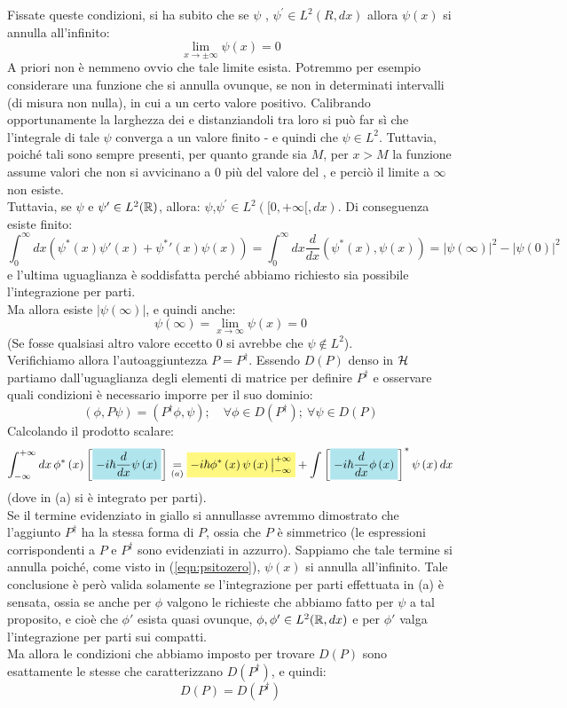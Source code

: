 \documentclass[../../FisicaTeorica.tex]{subfiles}
\begin{document}
Fissate queste condizioni, si ha subito che se $\psi$ , $\psi^\prime\in L^2(R, dx)$ allora $\psi(x)$ si annulla all'infinito:
\[
\lim_{x\rightarrow\pm\infty}{\psi\left(x\right)}=0
\]
A priori non è nemmeno ovvio che tale limite esista. Potremmo per esempio considerare una funzione che si annulla ovunque, se non in determinati intervalli (di misura non nulla), in cui  a un certo valore positivo. Calibrando opportunamente la larghezza dei  e distanziandoli tra loro si può far sì che l'integrale di tale $\psi$ converga a un valore finito - e quindi che $\psi \in L^2$. Tuttavia, poiché tali  sono sempre presenti, per quanto grande sia $M$, per $x>M$ la funzione assume valori che non si avvicinano a $0$ più del valore del , e perciò il limite a $\infty$ non esiste.\\
Tuttavia, se $\psi$ e $\psi' \in L^2(\mathbb{R})$, allora: $\psi$,$\psi^\prime\in L^2([0, +\infty [, dx)$. Di conseguenza esiste finito:
\[
\int_0^\infty dx (\psi^*(x)\psi'(x)+{\psi^*}'(x)\psi(x)) = \int_0^\infty dx \frac{d}{dx}(\psi^*(x), \psi(x)) = |\psi(\infty)|^2 - |\psi(0)|^2
\]
e l'ultima uguaglianza è soddisfatta perché abbiamo richiesto sia possibile l'integrazione per parti.\\
Ma allora esiste $|\psi(\infty)|$, e quindi anche:
\begin{equation}
\psi(\infty) = \lim_{x\to\infty} \psi(x) = 0
\label{eqn:psitozero}
\end{equation}
(Se fosse qualsiasi altro valore eccetto $0$ si avrebbe che $\psi \notin L^2$).\\

Verifichiamo allora l'autoaggiuntezza $P = P^\dag$. Essendo $D(P)$ denso in $\mathcal{H}$ partiamo dall'uguaglianza degli elementi di matrice per definire $P^\dag$ e osservare quali condizioni è necessario imporre per il suo dominio:
\[
\left(\phi,P\psi\right)=(P^\dag\phi,\psi); \quad \forall \phi \in D(P^\dag);\> \forall \psi \in D(P)
\]
Calcolando il prodotto scalare:
\[
\int_{-\infty}^{+\infty}{dx\,\phi^\ast\left(x\right)\left[\hlc{SkyBlue}{-i\hbar\frac{d}{dx}\psi\left(x\right)}\right]\underset{(a)}{=}
\hlc{Yellow}{-i\hbar\phi^\ast\left(x\right)\psi\left(x\right)\big|_{-\infty}^{+\infty}}+\int{\left[\hlc{SkyBlue}{-i\hbar\frac{d}{dx}\phi\left(x\right)}\right]^\ast\psi\left(x\right)dx}}
\]
(dove in (a) si è integrato per parti).\\
Se il termine evidenziato in giallo si annullasse avremmo dimostrato che l'aggiunto $P^\dag$ ha la stessa forma di $P$, ossia che $P$ è simmetrico (le espressioni corrispondenti a $P$ e $P^\dag$ sono evidenziati in azzurro). Sappiamo che tale termine si annulla poiché, come visto in (\ref{eqn:psitozero}), $\psi(x)$ si annulla all'infinito. Tale conclusione è però valida solamente se l'integrazione per parti effettuata in (a) è sensata, ossia se anche per $\phi$ valgono le richieste che abbiamo fatto per $\psi$ a tal proposito, e cioè che $\phi'$ esista quasi ovunque, $\phi, \phi' \in L^2(\mathbb{R},dx)$ e per $\phi'$ valga l'integrazione per parti sui compatti.\\
Ma allora le condizioni che abbiamo imposto per trovare $D(P)$ sono esattamente le stesse che caratterizzano $D\left(P^\dag\right)$, e quindi:
\[
D\left(P\right)=D(P^\dag)
\]
\end{document}
